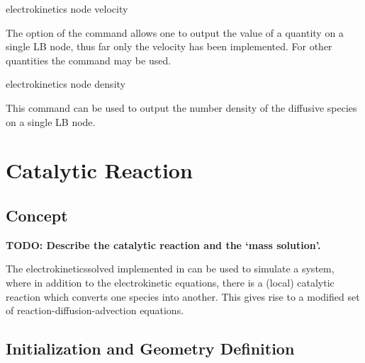 \begin{essyntax}
  electrokinetics node    velocity
  \begin{features}
  \end{features}
\end{essyntax}
The  option of the  command allows one to output 
the value of a quantity on a single LB node, thus far only the velocity has been
implemented. For other quantities the  command may be used. 

\begin{essyntax}
  electrokinetics  node    density
  \begin{features}
  \end{features}
\end{essyntax}
This command can be used to output the number density of the 
diffusive species on a single LB node.

\section{Catalytic Reaction}

\subsection{Concept}

\textbf{TODO: Describe the catalytic reaction and the `mass solution'.}

The electrokineticssolved implemented in \es{} can be used to simulate a system,
where in addition to the electrokinetic equations, there is a (local) catalytic
reaction which converts one species into another. This gives rise to a modified
set of reaction-diffusion-advection equations. 

\subsection{\label{ssec:ek-reac-init}Initialization and Geometry Definition}

